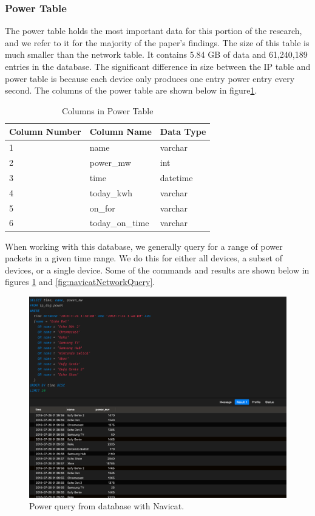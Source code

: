 \subsubsection{Power Table}

The power table holds the most important data for this portion of the research, and we refer to it for the majority of the paper's findings. The size of this table is much smaller than the network table. It contains 5.84 GB of data and 61,240,189 entries in the database. The significant difference in size between the IP table and power table is because each device only produces one entry power entry every second. The columns of the power table are shown below in figure\ref{tab:powcol}.

\begin{table}[H]
    \centering
    \caption{Columns in Power Table}
    \begin{tabular}{@{}lll@{}}
    \toprule
    Column Number & Column Name     & Data Type \\ \midrule
    1             & name            & varchar   \\
    2             & power\_mw       & int       \\
    3             & time            & datetime  \\
    4             & today\_kwh      & varchar   \\
    5             & on\_for         & varchar   \\
    6             & today\_on\_time & varchar
    \end{tabular}
    \label{tab:powcol}
    \end{table}

When working with this database, we generally query for a range of power packets in a given time range. We do this for either all devices, a subset of devices, or a single device. Some of the commands and results are shown below in figures \ref{fig:navicatPowerQuery} and \ref{fig:navicatNetworkQuery}.

\begin{figure}[H]
    \centering
    \includegraphics[width=1\textwidth]{figures/navicatPowerQuery.png}
    \caption{Power query from database with Navicat.}
    \label{fig:navicatPowerQuery}
\end{figure}

